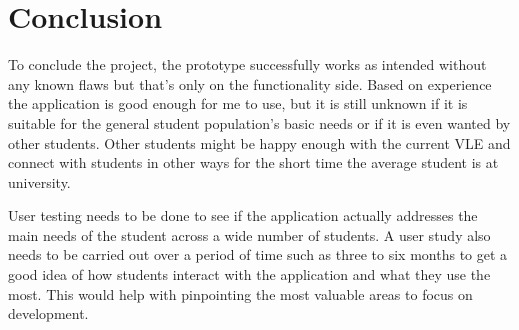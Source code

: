 \chapter{Conclusion}

To conclude the project, the prototype successfully works as intended without any known flaws but that's only on the functionality side. Based on experience the application is good enough for me to use, but it is still unknown if it is suitable for the general student population's basic needs or if it is even wanted by other students. Other students might be happy enough with the current VLE and connect with students in other ways for the short time the average student is at university.

User testing needs to be done to see if the application actually addresses the main needs of the student across a wide number of students. A user study also needs to be carried out over a period of time such as three to six months to get a good idea of how students interact with the application and what they use the most. This would help with pinpointing the most valuable areas to focus on development.
